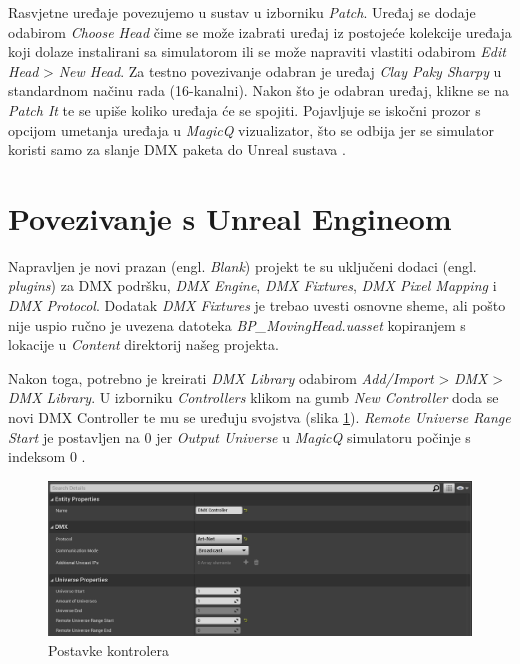 \documentclass[times, utf8, zavrsni, numeric]{fer}
\begin{document}
Rasvjetne uređaje povezujemo u sustav u izborniku \emph{Patch}. Uređaj se dodaje odabirom \emph{Choose Head} čime se može izabrati uređaj iz postojeće kolekcije uređaja koji dolaze instalirani sa simulatorom ili se može napraviti vlastiti odabirom \emph{Edit Head} > \emph{New Head}. Za testno povezivanje odabran je uređaj \emph{Clay Paky Sharpy} u standardnom načinu rada (16-kanalni). Nakon što je odabran uređaj, klikne se na \emph{Patch It} te se upiše koliko uređaja će se spojiti. Pojavljuje se iskočni prozor s opcijom umetanja uređaja u \emph{MagicQ} vizualizator, što se odbija jer se simulator koristi samo za slanje DMX paketa do Unreal sustava \cite{MagicQ_Manual}.

\section{Povezivanje s Unreal Engineom}
Napravljen je novi prazan (engl. \emph{Blank}) projekt te su uključeni dodaci (engl. \emph{plugins}) za DMX podršku, \emph{DMX Engine}, \emph{DMX Fixtures}, \emph{DMX Pixel Mapping} i \emph{DMX Protocol}. Dodatak \emph{DMX Fixtures} je trebao uvesti osnovne sheme, ali pošto nije uspio ručno je uvezena datoteka \emph{BP\_MovingHead.uasset} kopiranjem s lokacije \newline u \emph{Content} direktorij našeg projekta.

Nakon toga, potrebno je kreirati \emph{DMX Library} odabirom \emph{Add/Import} > \emph{DMX} > \emph{DMX Library}. U izborniku \emph{Controllers} klikom na gumb \emph{New Controller} doda se novi DMX Controller te mu se uređuju svojstva (slika \ref{fig:slika 6-1}). \emph{Remote Universe Range Start} je postavljen na 0 jer \emph{Output Universe} u \emph{MagicQ} simulatoru počinje s indeksom 0 \cite{MagicQ_Setup}.

\begin{figure}[htp]
	\centering
	\includegraphics[width=\linewidth]{slika 6-1.png}
	\caption{Postavke kontrolera}
	\label{fig:slika 6-1}
\end{figure}
\end{document}
